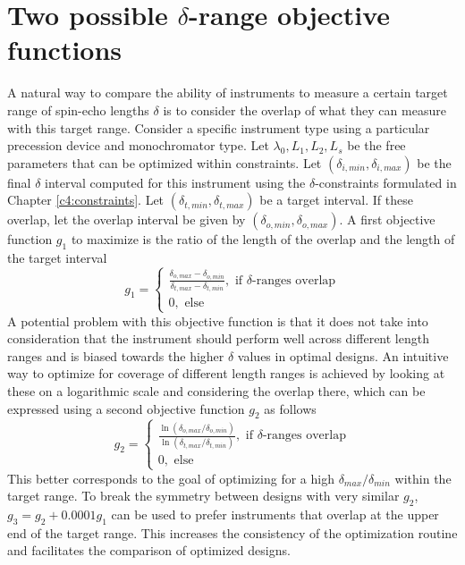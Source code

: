 \section{Two possible $\delta$-range objective functions}
\label{c5.2}
A natural way to compare the ability of instruments to measure a certain target range of spin-echo lengths $\delta$ is to consider the overlap of what they can measure with this target range. Consider a specific instrument type using a particular precession device and monochromator type. Let $\lambda_0, L_1, L_2, L_s$ be the free parameters that can be optimized within constraints. Let $(\delta_{i, min},\delta_{i, max})$ be the final $\delta$ interval computed for this instrument using the $\delta$-constraints formulated in Chapter \ref{c4:constraints}. Let $(\delta_{t, min},\delta_{t, max})$ be a target interval. If these overlap, let the overlap interval be given by $(\delta_{o, min},\delta_{o, max})$. A first objective function $g_1$ to maximize is the ratio of the length of the overlap and the length of the target interval
$$g_1 = \begin{cases}
	\frac{\delta_{o, max}-\delta_{o, min}}{\delta_{t, max} - \delta_{t, min}},\text{ if $\delta$-ranges overlap}\\
	0,\text{ else}
\end{cases}$$
A potential problem with this objective function is that it does not take into consideration that the instrument should perform well across different length ranges and is biased towards the higher $\delta$ values in optimal designs. An intuitive way to optimize for coverage of different length ranges is achieved by looking at these on a logarithmic scale and considering the overlap there, which can be expressed using a second objective function $g_2$ as follows 
$$g_2 = \begin{cases}
	\frac{\ln(\delta_{o, max}/\delta_{o, min})}{\ln(\delta_{t, max}/\delta_{t, min})},\text{ if $\delta$-ranges overlap}\\
	0,\text{ else}
\end{cases}$$
This better corresponds to the goal of optimizing for a high $\delta_{max}/\delta_{min}$ within the target range. To break the symmetry between designs with very similar $g_2$, $g_3 = g_2 + 0.0001 g_1$ can be used to prefer instruments that overlap at the upper end of the target range. This increases the consistency of the optimization routine and facilitates the comparison of optimized designs. 

